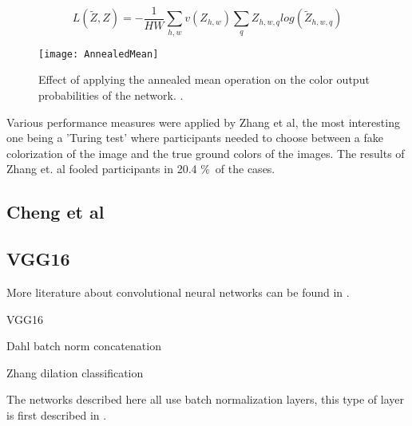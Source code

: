 \begin{equation}
L(\widetilde{Z},Z)=-\frac{1}{HW}\sum_{h,w}v(Z_{h,w})\sum_q^{}{Z_{h,w,q}log({\widetilde{Z}_{h,w,q}})}
\label{eq:lossZhang}
\end{equation}

\begin{figure}
\centering
	\texttt{[image: AnnealedMean]}
\centering
\caption{Effect of applying the annealed mean operation on the  color output probabilities of the network. \cite{yu2015multi}.}
\label{fig:anmean}
\end{figure}

Various performance measures were applied by Zhang et al, the most interesting one being a 'Turing test' where participants needed to choose between a fake colorization of the image and the true ground colors of the images. The results of Zhang et. al fooled participants in 20.4 \%\ of the cases. 



\subsection{Cheng et al}

\subsection{VGG16}




More literature about convolutional neural networks can be found in \cite{GoodfellowBOOK}. 


%

VGG16




Dahl
batch norm
concatenation




Zhang
dilation
classification









The networks described here all use batch normalization layers, this type of layer is first described in \cite{ioffe2015batch}. 

